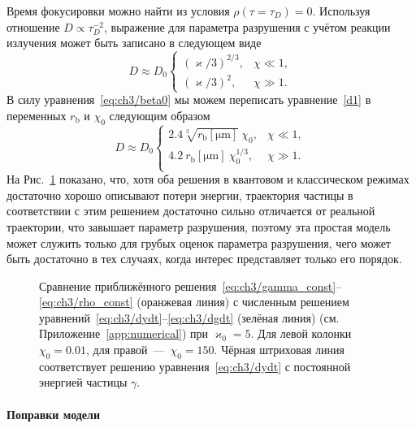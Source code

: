 Время фокусировки можно найти из условия $\rho(\tau = \tau_D) = 0 $.
Используя отношение $D\propto \tau_D^{-2}$, выражение для параметра разрушения с учётом реакции излучения может быть записано в следующем виде
\begin{equation}
    \label{eq:ch3/dratio_simple}
    D \approx D_0 
    \begin{cases}
    \left( \varkappa /3 \right)^{2/3} , & \chi \ll 1, \\
    \left( \varkappa /3 \right)^2, &  \chi \gg 1.
    \end{cases}
\end{equation}
В силу уравнения~\eqref{eq:ch3/beta0} мы можем переписать уравнение~\eqref{d1} в переменных $r_\mathrm{b}$ и $\chi_0$ следующим образом
\begin{equation}
    D \approx 
    D_0  \begin{cases}
        2.4 \sqrt[3]{r_\mathrm{b}[\si{\um}]}\ \chi_0, & \chi \ll 1, \\
        4.2 \ r_\mathrm{b}[\si{\um}]\ \chi_0^{1/3}, & \chi \gg 1. \\
    \end{cases}
\end{equation}
На Рис.~\ref{fig:ch3/sec2/motionless} показано, что, хотя оба решения в квантовом и классическом режимах достаточно хорошо описывают потери энергии, траектория частицы в соответствии с этим решением достаточно сильно отличается от реальной траектории, что завышает параметр разрушения, поэтому эта простая модель может служить только для грубых оценок параметра разрушения, чего может быть достаточно в тех случаях, когда интерес представляет только его порядок.

\begin{figure}
    \caption[Сравнение аналитического и численного решений уравнений движения частиц при столкновении пучков в режиме преобладания излучения]{\label{fig:ch3/sec2/motionless} 
    Сравнение приближённого решения~\eqref{eq:ch3/gamma_const}--\eqref{eq:ch3/rho_const} (оранжевая линия) с численным решением уравнений~\eqref{eq:ch3/dydt}--\eqref{eq:ch3/dgdt} (зелёная линия) (см. Приложение~\ref{app:numerical}) при $\varkappa_0=5$. Для левой колонки $\chi_0=0.01$, для правой~---~$\chi_0=150$. Чёрная штриховая линия соответствует решению уравнения~\eqref{eq:ch3/dydt} с постоянной энергией частицы $\gamma$.}
\end{figure}

\paragraph{Поправки модели}


